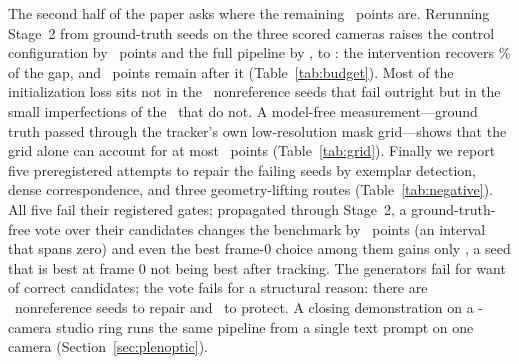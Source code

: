 \documentclass[journal]{IEEEtran}
\begin{document}
The second half of the paper asks where the remaining \totalGap\ points are.
Rerunning Stage~2 from ground-truth seeds on the three scored cameras raises
the control configuration by \gtSeedControlDelta\ points and the full pipeline
by \gtSeedHeadlineDelta, to \gtSeedHeadline: the intervention recovers
\gtSeedHeadlinePct\% of the gap, and \gtSeedRemaining\ points remain after it
(Table~\ref{tab:budget}). Most of the initialization loss sits not in the
\nFzero\ nonreference seeds that fail outright but in the small imperfections of
the \nNzero\ that do not. A model-free measurement---ground truth passed
through the tracker's own low-resolution mask grid---shows that the grid alone
can account for at most \lossNow\ points (Table~\ref{tab:grid}). Finally we
report five preregistered attempts to repair the failing seeds by exemplar
detection, dense correspondence, and three geometry-lifting routes
(Table~\ref{tab:negative}). All five fail their registered gates; propagated
through Stage~2, a ground-truth-free vote over their candidates changes the
benchmark by \voteReal\ points (an interval that spans zero) and even the best
frame-0 choice among them gains only \oracleReal, a seed that is best at frame 0
not being best after tracking. The generators fail for want of correct
candidates; the vote fails for a structural reason: there are
\nFzero\ nonreference seeds to repair and \nNzero\ to protect. A closing
demonstration on a \plenCams-camera studio ring runs the same pipeline from a
single text prompt on one camera (Section~\ref{sec:plenoptic}).
\end{document}
